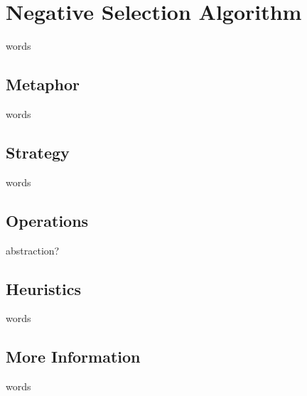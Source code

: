 %
%


%
%
\section{Negative Selection Algorithm}
words


%
%
\subsection{Metaphor}
words

%
%
\subsection{Strategy}
words


%
%
\subsection{Operations}
abstraction?


%
%
\subsection{Heuristics}
words

%
%
\subsection{More Information}
words


